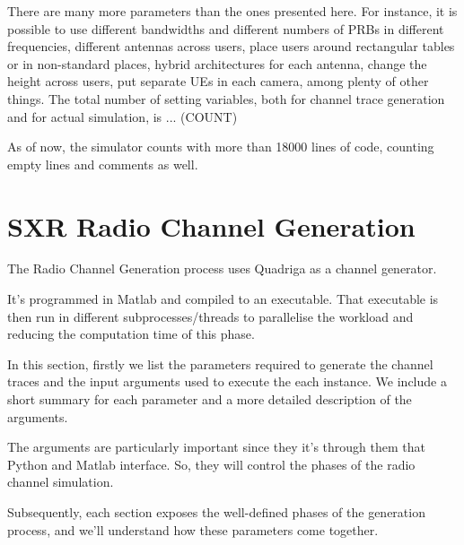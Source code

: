 \label{ap:d}






There are many more parameters than the ones presented here. For instance, it is possible to use different bandwidths and different numbers of PRBs in different frequencies, different antennas across users, place users around rectangular tables or in non-standard places, hybrid architectures for each antenna, change the height across users, put separate UEs in each camera, among plenty of other things. The total number of setting variables, both for channel trace generation and for actual simulation, is ... (COUNT)

As of now, the simulator counts with more than 18000 lines of code, counting empty lines and comments as well.






\section{SXR Radio Channel Generation}
\label{sec:implementation}




The Radio Channel Generation process uses Quadriga as a channel generator. 

It's programmed in Matlab and compiled to an executable. That executable is then run in different subprocesses/threads to parallelise the workload and reducing the computation time of this phase.


In this section, firstly we list the parameters required to generate the channel traces and the input arguments used to execute the each instance. We include a short summary for each parameter and a more detailed description of the arguments.

The arguments are particularly important since they it's through them that Python and Matlab interface. So, they will control the phases of the radio channel simulation.

Subsequently, each section exposes the well-defined phases of the generation process, and we'll understand how these parameters come together.

